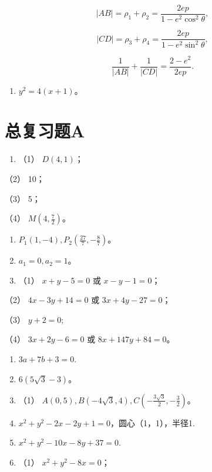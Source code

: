 \[
| AB | = \rho_{1} + \rho_{2} = \frac {2 e p}{1 - e^{2} \cos^{2} \theta},
\]

\[
| CD | = \rho_{3} + \rho_{4} = \frac {2 e p}{1 - e^{2} \sin^{2} \theta},
\]

\[
\frac {1}{| AB |} + \frac {1}{| CD |} = \frac {2 - e^{2}}{2 e p}.
\]

\begin{enumerate}
\def\labelenumi{\arabic{enumi}.}
\setcounter{enumi}{7}
\tightlist
\item
  \(y^{2} = 4(x + 1)\)。
\end{enumerate}

\section{总复习题A}\label{ux603bux590dux4e60ux9898a-1}

\begin{enumerate}
\def\labelenumi{\arabic{enumi}.}
\setcounter{enumi}{1}
\tightlist
\item
  （1） \(D(4, 1)\)；
\end{enumerate}

（2） 10；

（3） 5；

（4） \(M\left(4, \frac{7}{2}\right)\)。

\begin{enumerate}
\def\labelenumi{\arabic{enumi}.}
\setcounter{enumi}{4}
\item
  \(P_{1}(1, -4), P_{2}\left(\frac{27}{7}, -\frac{8}{7}\right)\)。
\item
  \(a_1 = 0, a_2 = 1\)。
\item
  （1） \(x + y - 5 = 0\) 或 \(x - y - 1 = 0\)；
\end{enumerate}

（2） \(4x - 3y + 14 = 0\) 或 \(3x + 4y - 27 = 0\)；

（3） \(y + 2 = 0;\)

（4） \(3x + 2y - 6 = 0\) 或 \(8x + 147y + 84 = 0\)。

\begin{enumerate}
\def\labelenumi{\arabic{enumi}.}
\setcounter{enumi}{7}
\item
  \(3a + 7b + 3 = 0.\)
\item
  \(6(5\sqrt{3}-3)\)。
\item
  （1）
  \(A(0,5), B(-4\sqrt{3},4), C\left(-\frac{3\sqrt{3}}{2}, -\frac{3}{2}\right)\)。
\item
  \(x^{2} + y^{2} - 2x - 2y + 1 = 0\)，圆心（1，1），半径1.
\item
  \(x^{2} + y^{2} - 10x - 8y + 37 = 0.\)
\item
  （1） \(x^{2} + y^{2} - 8x = 0\)；
\end{enumerate}

